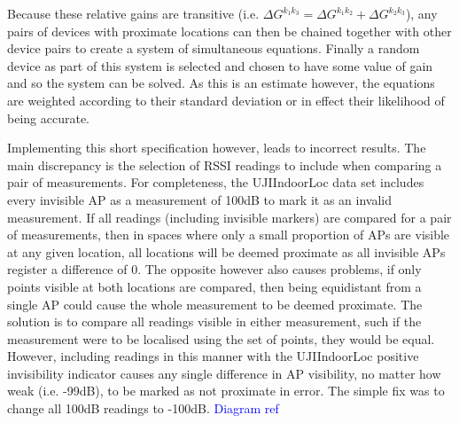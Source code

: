 \documentclass{UoYCSproject}
\begin{document}
            Because these relative gains are transitive (i.e. $\Delta G^{k_1k_3} = \Delta G^{k_1k_2} + \Delta G^{k_2k_3}$), any pairs of devices with proximate locations can then be chained together with other device pairs to create a system of simultaneous equations. Finally a random device as part of this system is selected and chosen to have some value of gain and so the system can be solved. As this is an estimate however, the equations are weighted according to their standard deviation or in effect their likelihood of being accurate.
           
            Implementing this short specification however, leads to incorrect results. The main discrepancy is the selection of RSSI readings to include when comparing a pair of measurements. For completeness, the UJIIndoorLoc data set includes every invisible AP as a measurement of 100dB to mark it as an invalid measurement. If all readings (including invisible markers) are compared for a pair of measurements, then in spaces where only a small proportion of APs are visible at any given location, all locations will be deemed proximate as all invisible APs register a difference of $0$. The opposite however also causes problems, if only points visible at both locations are compared, then being equidistant from a single AP could cause the whole measurement to be deemed proximate. The solution is to compare all readings visible in either measurement, such if the measurement were to be localised using the set of points, they would be equal. However, including readings in this manner with the UJIIndoorLoc positive invisibility indicator causes any single difference in AP visibility, no matter how weak (i.e. -99dB), to be marked as not proximate in error. The simple fix was to change all 100dB readings to -100dB. \textcolor{blue}{Diagram ref}
            
\end{document}
